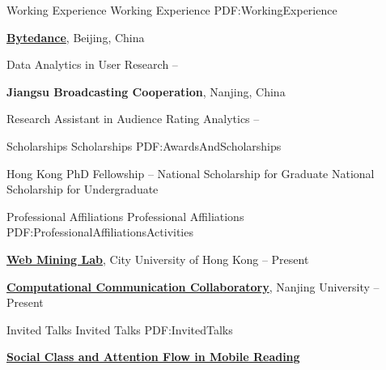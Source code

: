 \documentclass[letterpaper,MMMyyyy,nonstopmode]{CV}
\begin{document}
\begin{Body}
\Section
{Working Experience}
{Working Experience}
{PDF:WorkingExperience}

\Entry
\href{https://bytedance.com/}
{\textbf{Bytedance}},
Beijing, China

\Gap
\BulletItem
Data Analytics in User Research
\hfill
{} --

\Entry
\Gap
{\textbf{Jiangsu Broadcasting Cooperation}},
Nanjing, China

\BulletItem
Research Assistant in Audience Rating Analytics
\hfill
{} --

%


\Section
{Scholarships}
{Scholarships}
{PDF:AwardsAndScholarships}

\BulletItem
Hong Kong PhD Fellowship
\hfill
{} --
\BulletItem
National Scholarship for Graduate
\hfill
{}
\BulletItem
National Scholarship for Undergraduate
\hfill
{}


\Section
{Professional Affiliations}
{Professional Affiliations}
{PDF:ProfessionalAffiliationsActivities}

\Entry
\href{http://weblab.com.cityu.edu.hk/blog}
{\textbf{Web Mining Lab}}, City University of Hong Kong
\hfill
{} --
Present

\href{https://computational-communication.com/collaboratory/}
{\textbf{Computational Communication Collaboratory}},
Nanjing University
\hfill
{} --
Present

\Section
{Invited Talks}
{Invited Talks}
{PDF:InvitedTalks}

\Entry
\href{http://weblab.com.cityu.edu.hk/blog}
{\textbf{Social Class and Attention Flow in Mobile Reading}}


\end{Body}
\end{document}
